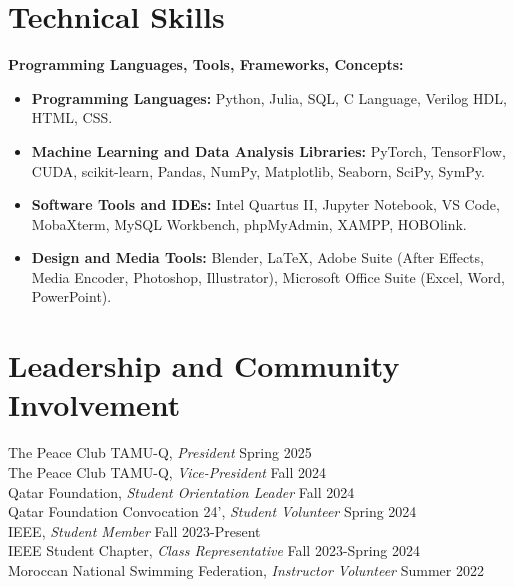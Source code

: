 \documentclass[resmargin, 10pt]{res} %
\begin{document}
\begin{resume}
\vspace{-5pt}
\section{Technical Skills}

{\bf Programming Languages, Tools, Frameworks, Concepts:}  \\
\begin{itemize}[itemsep=0em]
\vspace{-5pt}
\item {\bf Programming Languages:} Python, Julia, SQL, C Language, Verilog HDL, HTML, CSS.
\item {\bf Machine Learning and Data Analysis Libraries:} PyTorch, TensorFlow, CUDA, scikit-learn, Pandas, NumPy, Matplotlib, Seaborn, SciPy, SymPy.
\item {\bf Software Tools and IDEs:} Intel Quartus II, Jupyter Notebook, VS Code, MobaXterm, MySQL Workbench, phpMyAdmin, XAMPP, HOBOlink.
\item {\bf Design and Media Tools:} Blender, LaTeX, Adobe Suite (After Effects, Media Encoder, Photoshop, Illustrator), Microsoft Office Suite (Excel, Word, PowerPoint).
\end{itemize}

\vspace{-3pt}
\section{Leadership and Community Involvement} 

The Peace Club TAMU-Q, {\sl President} \hfill Spring 2025 \\
The Peace Club TAMU-Q, {\sl Vice-President} \hfill Fall 2024 \\
Qatar Foundation, {\sl Student Orientation Leader} \hfill Fall 2024 \\
Qatar Foundation Convocation 24', {\sl Student Volunteer} \hfill Spring 2024 \\
IEEE, {\sl Student Member} \hfill Fall 2023-Present \\
IEEE Student Chapter, {\sl Class Representative} \hfill Fall 2023-Spring 2024 \\
Moroccan National Swimming Federation, {\sl Instructor Volunteer} \hfill Summer 2022


\end{resume}
\end{document}
